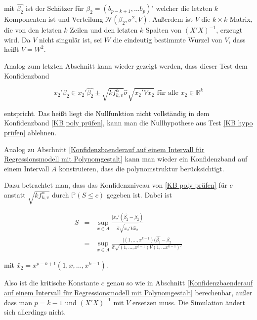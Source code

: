 \documentclass[12pt,a4paper]{article}
\theoremstyle{definition}
\theoremstyle{definition}
\theoremstyle{definition}
\theoremstyle{definition}
\begin{document}
mit $\hat{\beta_2}$ ist der Schätzer für $\beta_2=(b_{p-k+1}, \ldots b_{p})'$ welcher die letzten $k$ Komponenten ist und Verteilung $\mathscr{N}(\beta_2,\sigma^2,V)$. Außerdem ist $V$ die $k \times k$ Matrix, die von den letzten $k$ Zeilen und den letzten $k$ Spalten von $(X'X)^{-1}$, erzeugt wird. Da $V$ nicht singulär ist, sei $W$ die eindeutig bestimmte Wurzel von $V$, dass heißt $V=W^2$. 

Analog zum letzten Abschnitt kann wieder gezeigt werden, dass dieser Test dem Konfidenzband 

\begin{equation}\label{KB poly prüfen}
x_2' \beta_2 \in x_2' \hat{\beta_2} \pm \sqrt{k f^{\alpha}_{k,v}} \hat{\sigma} \sqrt{x_2' V x_2} \text{ für alle } x_2 \in \mathbb{R}^k
\end{equation}

entspricht. Das heißt liegt die Nullfunktion nicht vollständig in dem Konfidenzband \eqref{KB poly prüfen}, kann man die Nullhypothese aus Test \eqref{KB hypo prüfen} ablehnen.

Analog zu Abschnitt \ref{Konfidenzbaenderauf auf einem Intervall für Regressionsmodell mit Polynomgestalt} kann man wieder ein Konfidenzband auf einem Intervall $A$ konstruieren, dass die polynomstruktur berücksichtigt.

Dazu betrachtet man, dass das Konfidenzniveau von \eqref{KB poly prüfen} für $c$ anstatt $\sqrt{k f^{\alpha}_{k,v}}$ durch $\mathbb{P}(S\leq c)$ gegeben ist. Dabei ist

\begin{eqnarray*}
S &=& \sup_{x \in A} \frac{\vert \tilde{x_2}' (\hat{\beta_2}-\beta_2)}{\hat{\sigma} \sqrt{\tilde{x_2'}V\tilde{x_2}}} \\
&=& \sup_{x \in A} \frac{\vert (1, \ldots, x^{k-1})(\hat{\beta_2}-\beta_2}{\hat{\sigma} \sqrt{(1, \ldots, x^{k-1}) V (1, \ldots x^{k-1})'}}
\end{eqnarray*}

mit $\tilde{x_2}= x^{p-k+1}(1, x, \ldots, x^{k-1})$.

Also ist die kritische Konstante $c$ genau so wie in Abschnitt \ref{Konfidenzbaenderauf auf einem Intervall für Regressionsmodell mit Polynomgestalt} berechenbar, außer dass man $p=k-1$ und $(X'X)^{-1}$ mit $V$ ersetzen muss. Die Simulation ändert sich allerdings nicht.
\end{document}
